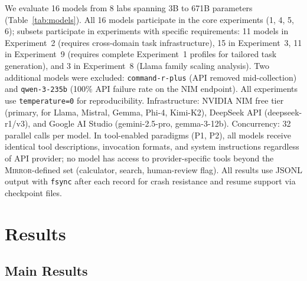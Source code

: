 \documentclass[10pt]{article}
\newcommand{\mirror}{\textsc{Mirror}}
\begin{document}


We evaluate 16 models from 8 labs spanning 3B to 671B parameters
(Table~\ref{tab:models}). All 16 models participate in the core experiments (1, 4, 5, 6); subsets participate in experiments with specific requirements: 11 models in Experiment~2 (requires cross-domain task infrastructure), 15 in Experiment~3, 11 in Experiment~9 (requires complete Experiment~1 profiles for tailored task generation), and 3 in Experiment~8 (Llama family scaling analysis). Two additional models were excluded:
\texttt{command-r-plus} (API removed mid-collection) and \texttt{qwen-3-235b}
(100\% API failure rate on the NIM endpoint). All experiments use
\texttt{temperature=0} for reproducibility. Infrastructure: NVIDIA NIM free tier
(primary, for Llama, Mistral, Gemma, Phi-4, Kimi-K2), DeepSeek API
(deepseek-r1/v3), and Google AI Studio (gemini-2.5-pro, gemma-3-12b).
Concurrency: 32 parallel calls per model.
In tool-enabled paradigms (P1, P2), all models receive identical tool descriptions,
invocation formats, and system instructions regardless of API provider; no model
has access to provider-specific tools beyond the \mirror{}-defined set
(calculator, search, human-review flag). All results use JSONL output with
\texttt{fsync} after each record for crash resistance and resume support via
checkpoint files.

\section{Results}
\label{sec:results}

\subsection{Main Results}
\end{document}
